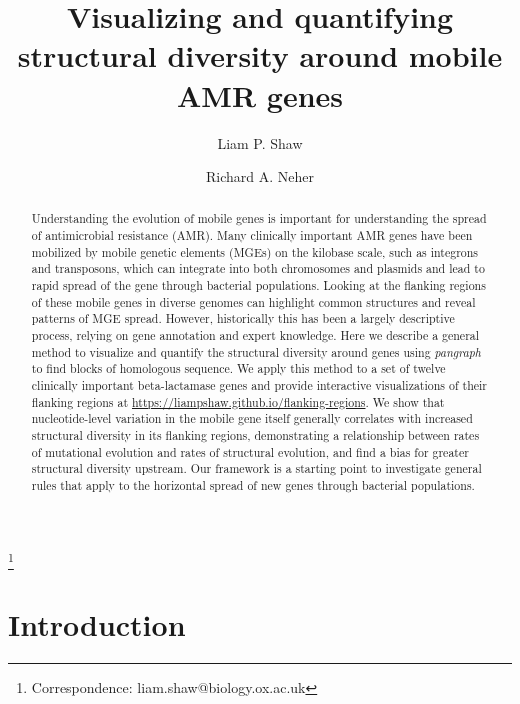 \documentclass[rmp,superscriptaddress,11pt]{revtex4-1}
\begin{document}
\title{Visualizing and quantifying structural diversity around mobile AMR genes}
\author{Liam P. Shaw}
\thanks{Correspondence: liam.shaw@biology.ox.ac.uk}
\author{Richard A. Neher}

\begin{abstract}
Understanding the evolution of mobile genes is important for understanding the spread of antimicrobial resistance (AMR). Many clinically important AMR genes have been mobilized by mobile genetic elements (MGEs) on the kilobase scale, such as integrons and transposons, which can integrate into both chromosomes and plasmids and lead to rapid spread of the gene through bacterial populations. Looking at the flanking regions of these mobile genes in diverse genomes can highlight common structures and reveal patterns of MGE spread. However, historically this has been a largely descriptive process, relying on gene annotation and expert knowledge. Here we describe a general method to visualize and quantify the structural diversity around genes using \textit{pangraph} to find blocks of homologous sequence. We apply this method to a set of twelve clinically important beta-lactamase genes and provide interactive visualizations of their flanking regions at \href{https://liampshaw.github.io/flanking-regions}{https://liampshaw.github.io/flanking-regions}. We show that nucleotide-level variation in the mobile gene itself generally correlates with increased structural diversity in its flanking regions, demonstrating a relationship between rates of mutational evolution and rates of structural evolution, and find a bias for greater structural diversity upstream. Our framework is a starting point to investigate general rules that apply to the horizontal spread of new genes through bacterial populations. 
\end{abstract}


\maketitle

\section{Introduction}
\end{document}
